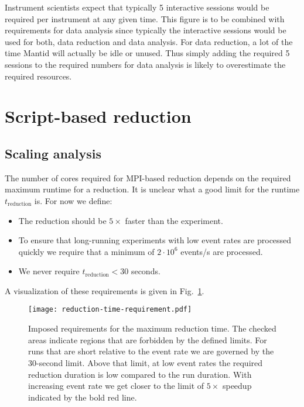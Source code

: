 \documentclass[a4paper,english,numbers=noenddot,bibliography=totoc,chapterprefix=on,DIV=12]{scrartcl}
\newcommand{\Treduction}{t_{\text{reduction}}}
\newcommand{\mantid}{Mantid\xspace}
\begin{document}
Instrument scientists expect that typically 5 interactive sessions would be required per instrument at any given time.
This figure is to be combined with requirements for data analysis since typically the interactive sessions would be used for both, data reduction and data analysis.
For data reduction, a lot of the time \mantid will actually be idle or unused.
Thus simply adding the required 5 sessions to the required numbers for data analysis is likely to overestimate the required resources.




\section{Script-based reduction}


\subsection{Scaling analysis}
\label{sec:scaling-analysis}

The number of cores required for MPI-based reduction depends on the required maximum runtime for a reduction.
It is unclear what a good limit for the runtime $\Treduction$ is.
For now we define:

\begin{itemize}
  \item The reduction should be $5\times$ faster than the experiment.
  \item To ensure that long-running experiments with low event rates are processed quickly we require that a minimum of $2\cdot10^6$ events/s are processed.
  \item We never require $\Treduction < 30$ seconds.
\end{itemize}
A visualization of these requirements is given in Fig.~\ref{fig:reduction-time-requirement}.

\begin{figure}
  \centering
\texttt{[image: reduction-time-requirement.pdf]}
\caption{\label{fig:reduction-time-requirement}Imposed requirements for the maximum reduction time. The checked areas indicate regions that are forbidden by the defined limits. For runs that are short relative to the event rate we are governed by the 30-second limit. Above that limit, at low event rates the required reduction duration is low compared to the run duration. With increasing event rate we get closer to the limit of $5\times$ speedup indicated by the bold red line.}
\end{figure}
\end{document}
